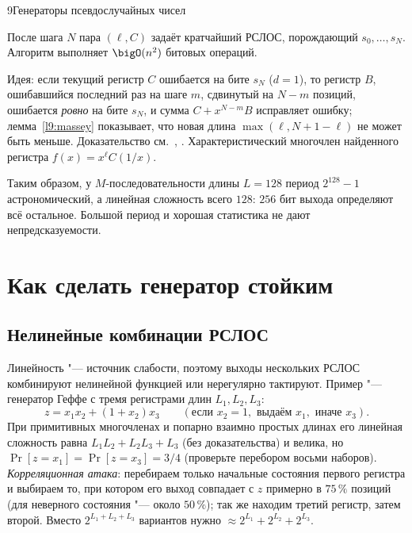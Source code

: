 \begin{lecture}{9}{Генераторы псевдослучайных чисел}
\begin{theorem}
После шага $N$ пара $(\ell, C)$ задаёт кратчайший РСЛОС, порождающий $s_0, \dots, s_N$.
Алгоритм выполняет $\bigO(n^2)$ битовых операций.
\end{theorem}

Идея: если текущий регистр $C$ ошибается на бите $s_N$ ($d = 1$), то регистр $B$, ошибавшийся
последний раз на шаге $m$, сдвинутый на $N - m$ позиций, ошибается \emph{ровно} на бите $s_N$, и
сумма $C + x^{N-m} B$ исправляет ошибку; лемма~\ref{l9:massey} показывает, что новая длина
$\max(\ell, N + 1 - \ell)$ не может быть меньше. Доказательство см.~\cite{massey},
\cite[разд.~6.2.3]{hac}. Характеристический многочлен найденного регистра $f(x) = x^\ell C(1/x)$.


\begin{remark}
Таким образом, у $M$-последовательности длины $L = 128$ период $2^{128} - 1$ астрономический, а
линейная сложность всего $128$: $256$ бит выхода определяют всё остальное. Большой период и
хорошая статистика не дают непредсказуемости.
\end{remark}


\section{Как сделать генератор стойким}

\subsection{Нелинейные комбинации РСЛОС}

Линейность "--- источник слабости, поэтому выходы нескольких РСЛОС комбинируют нелинейной
функцией или нерегулярно тактируют. Пример "--- генератор Геффе с тремя регистрами длин
$L_1, L_2, L_3$:
\[
  z = x_1 x_2 + (1 + x_2) x_3 \qquad (\text{если } x_2 = 1, \text{ выдаём } x_1, \text{ иначе } x_3).
\]
При примитивных многочленах и попарно взаимно простых длинах его линейная сложность равна
$L_1 L_2 + L_2 L_3 + L_3$ (без доказательства) и велика, но
$\Pr[z = x_1] = \Pr[z = x_3] = 3/4$ (проверьте перебором восьми наборов). \emph{Корреляционная
атака}: перебираем только начальные состояния первого регистра и выбираем то, при котором
его выход совпадает с $z$ примерно в $75\,\%$ позиций (для неверного состояния "--- около
$50\,\%$); так же находим третий регистр, затем второй. Вместо $2^{L_1 + L_2 + L_3}$ вариантов
нужно $\approx 2^{L_1} + 2^{L_2} + 2^{L_3}$.


\end{lecture}
